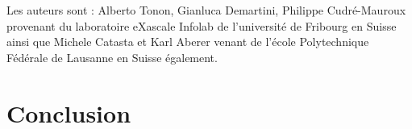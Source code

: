 \documentclass{article}
\begin{document}
Les auteurs sont :
Alberto Tonon, Gianluca Demartini, Philippe Cudré-Mauroux provenant du laboratoire eXascale Infolab de l'université de Fribourg en Suisse ainsi que Michele Catasta et Karl Aberer venant de l'école Polytechnique Fédérale de Lausanne en Suisse également.


\section{Conclusion}








\end{document}
